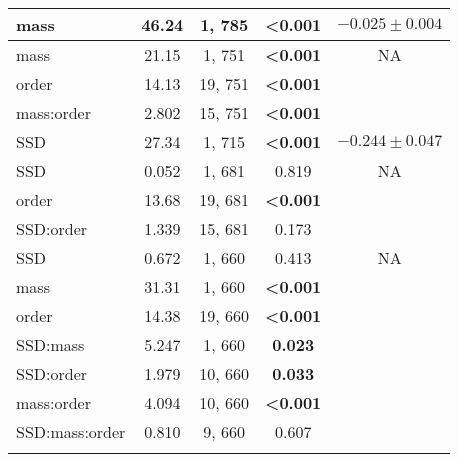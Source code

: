 \begin{longtable}{lcccc}
  mass & 46.24 & 1, 785 & \textbf{\textless 0.001} & $-0.025\pm 0.004$ \\
  \hline
  mass & 21.15 & 1, 751 & \textbf{\textless 0.001} & NA \\
  order & 14.13 & 19, 751 & \textbf{\textless 0.001} & \\
  mass:order & 2.802 & 15, 751 & \textbf{\textless 0.001} & \\
  \hline

  SSD & 27.34 & 1, 715 & \textbf{\textless 0.001} & $-0.244 \pm 0.047$ \\
  \hline
  SSD & 0.052 & 1, 681 & 0.819 & NA \\
  order & 13.68 & 19, 681 & \textbf{\textless 0.001} & \\
  SSD:order & 1.339 & 15, 681 & 0.173 & \\
  \hline

  SSD & 0.672 & 1, 660 & 0.413 & NA \\
  mass & 31.31 & 1, 660 & \textbf{\textless 0.001} &  \\
  order & 14.38 & 19, 660 & \textbf{\textless 0.001} & \\
  SSD:mass & 5.247 & 1, 660 & \textbf{0.023} & \\
  SSD:order & 1.979 & 10, 660 & \textbf{0.033} & \\
  mass:order & 4.094 & 10, 660 & \textbf{\textless 0.001} & \\
  SSD:mass:order & 0.810 & 9, 660 & 0.607 & \\

\hline
\label{table-outputs}
\end{longtable}

